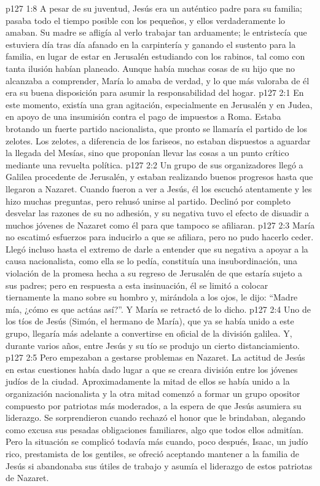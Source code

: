 \vs p127 1:8 A pesar de su juventud, Jesús era un auténtico padre para su familia; pasaba todo el tiempo posible con los pequeños, y ellos verdaderamente lo amaban. Su madre se afligía al verlo trabajar tan arduamente; le entristecía que estuviera día tras día afanado en la carpintería y ganando el sustento para la familia, en lugar de estar en Jerusalén estudiando con los rabinos, tal como con tanta ilusión habían planeado. Aunque había muchas cosas de su hijo que no alcanzaba a comprender, María lo amaba de verdad, y lo que más valoraba de él era su buena disposición para asumir la responsabilidad del hogar.
\vs p127 2:1 En este momento, existía una gran agitación, especialmente en Jerusalén y en Judea, en apoyo de una insumisión contra el pago de impuestos a Roma. Estaba brotando un fuerte partido nacionalista, que pronto se llamaría el partido de los zelotes. Los zelotes, a diferencia de los fariseos, no estaban dispuestos a aguardar la llegada del Mesías, sino que proponían llevar las cosas a un punto crítico mediante una revuelta política.
\vs p127 2:2 Un grupo de sus organizadores llegó a Galilea procedente de Jerusalén, y estaban realizando buenos progresos hasta que llegaron a Nazaret. Cuando fueron a ver a Jesús, él los escuchó atentamente y les hizo muchas preguntas, pero rehusó unirse al partido. Declinó por completo desvelar las razones de su no adhesión, y su negativa tuvo el efecto de disuadir a muchos jóvenes de Nazaret como él para que tampoco se afiliaran.
\vs p127 2:3 María no escatimó esfuerzos para inducirlo a que se afiliara, pero no pudo hacerlo ceder. Llegó incluso hasta el extremo de darle a entender que su negativa a apoyar a la causa nacionalista, como ella se lo pedía, constituía una insubordinación, una violación de la promesa hecha a su regreso de Jerusalén de que estaría sujeto a sus padres; pero en respuesta a esta insinuación, él se limitó a colocar tiernamente la mano sobre su hombro y, mirándola a los ojos, le dijo: “Madre mía, ¿cómo es que actúas así?”. Y María se retractó de lo dicho.
\vs p127 2:4 Uno de los tíos de Jesús (Simón, el hermano de María), que ya se había unido a este grupo, llegaría más adelante a convertirse en oficial de la división galilea. Y, durante varios años, entre Jesús y su tío se produjo un cierto distanciamiento.
\vs p127 2:5 Pero empezaban a gestarse problemas en Nazaret. La actitud de Jesús en estas cuestiones había dado lugar a que se creara división entre los jóvenes judíos de la ciudad. Aproximadamente la mitad de ellos se había unido a la organización nacionalista y la otra mitad comenzó a formar un grupo opositor compuesto por patriotas más moderados, a la espera de que Jesús asumiera su liderazgo. Se sorprendieron cuando rechazó el honor que le brindaban, alegando como excusa sus pesadas obligaciones familiares, algo que todos ellos admitían. Pero la situación se complicó todavía más cuando, poco después, Isaac, un judío rico, prestamista de los gentiles, se ofreció aceptando mantener a la familia de Jesús si abandonaba sus útiles de trabajo y asumía el liderazgo de estos patriotas de Nazaret.
